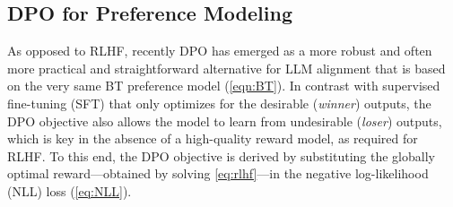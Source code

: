 \subsection{DPO for Preference Modeling}

As opposed to RLHF, recently DPO has emerged as a more robust and often more practical and straightforward alternative for LLM alignment that is based on the very same BT preference model (\cref{eqn:BT}). In contrast with supervised fine-tuning (SFT) that only optimizes for the desirable (\emph{winner}) outputs, the DPO objective also allows the model to learn from undesirable (\emph{loser}) outputs, which is key in the absence of a high-quality reward model, as required for RLHF. To this end, the DPO objective is derived by substituting the globally optimal reward---obtained by solving \cref{eq:rlhf}---in the negative log-likelihood (NLL) loss (\cref{eq:NLL}).

